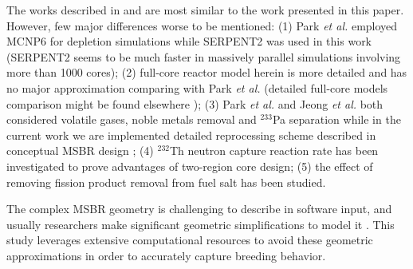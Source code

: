 The works described in \cite{park_whole_2015} and \cite{jeong_equilibrium_2016} 
are most similar to the work presented in this paper. However, few major differences 
worse to be mentioned: (1) Park \emph{et al.} employed MCNP6 for depletion 
simulations while SERPENT2 was used in this work (SERPENT2 seems to be much faster in 
massively parallel simulations involving more than 1000 cores); (2) full-core reactor 
model herein is more detailed and has no major approximation comparing with Park 
\emph{et al.} (detailed full-core models comparison might be found elsewhere
\cite{rykhlevskii_full-core_2017}); (3) Park \emph{et al.} and Jeong \emph{et al.} 
both considered volatile gases, noble metals removal and $^{233}$Pa separation while 
in the current work we are implemented detailed reprocessing scheme described in 
conceptual \gls{MSBR} design \cite{robertson_conceptual_1971}; (4) $^{232}$Th neutron 
capture reaction rate has been investigated to prove advantages of two-region core 
design; (5) the effect of removing fission product removal from fuel salt has been 
studied. 

The complex \gls{MSBR} geometry is challenging to describe in software input, 
and usually researchers make significant geometric simplifications to model it 
\cite{park_whole_2015}. This study leverages extensive computational 
resources to avoid these geometric approximations in order to accurately capture 
breeding behavior. 

